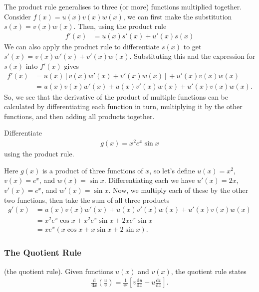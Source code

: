 The product rule generalises to three (or more) functions multiplied together. Consider $f(x) = u(x)v(x)w(x)$, we can first make the substitution $s(x) = v(x)w(x)$. Then, using the product rule 
\begin{align*}
    f'(x) &= u(x)s'(x) + u'(x)s(x)
\end{align*}
We can also apply the product rule to differentiate $s(x)$ to get $s'(x) = v(x)w'(x) + v'(x)w(x)$. Substituting this and the expression for $s(x)$ into $f'(x)$ gives
\begin{align*}
    f'(x) &= u(x)[v(x)w'(x)+v'(x)w(x)] + u'(x)v(x)w(x)\\
        &= u(x)v(x)w'(x) + u(x)v'(x)w(x) + u'(x)v(x)w(x). 
\end{align*}
So, we see that the derivative of the product of multiple functions can be calculated by differentiating each function in turn, multiplying it by the other functions, and then adding all products together.

\begin{example}
    Differentiate
    \begin{align*}
        g(x) = x^2 e^x \sin x
    \end{align*}
    using the product rule.
\end{example}

Here $g(x)$ is a product of three functions of $x$, so let's define $u(x)=x^2$, $v(x)=e^x$, and $w(x)=\sin x$. Differentiating each we have $u'(x)=2x$, $v'(x)=e^x$, and $w'(x)=\sin x$. Now, we multiply each of these by the other two functions, then take the sum of all three products
\begin{align*}
    g'(x) &= u(x)v(x)w'(x) + u(x)v'(x)w(x) + u'(x)v(x)w(x) \\
    &= x^2 e^x \cos x + x^2 e^x \sin x + 2x e^x \sin x \\
    &= xe^x(x \cos x + x \sin x + 2\sin x).
\end{align*}

\subsubsection{The Quotient Rule}

\begin{definition}
    (the quotient rule). Given functions $u(x)$ and $v(x)$, the quotient rule states
    \begin{align*}
        \frac{\mathrm{d}}{\mathrm{d}x} \left(\frac{u}{v}\right)= \frac{1}{v^2}\left[v\frac{\mathrm{d}u}{\mathrm{d}x} - u\frac{\mathrm{d}v}{\mathrm{d}x}\right].
    \end{align*}
\end{definition}


